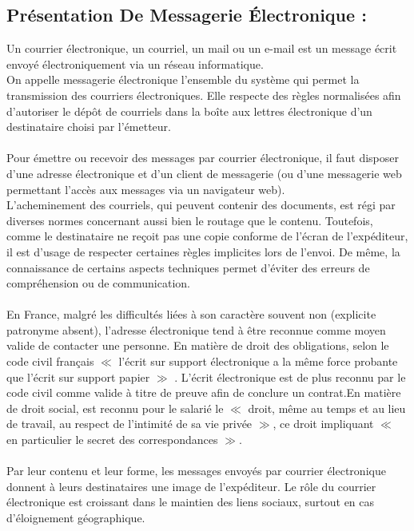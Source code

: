 \documentclass[french]{report}
\begin{document}
\subsection{\huge\textbf{Présentation De Messagerie Électronique :} }
\LARGE Un courrier électronique, un courriel, un mail ou un e-mail est un message écrit envoyé électroniquement via un réseau informatique.\\ 
On appelle messagerie électronique l'ensemble du système qui permet la transmission des courriers électroniques. Elle respecte des règles normalisées afin d'autoriser le dépôt de courriels dans la boîte aux lettres électronique d’un destinataire choisi par l'émetteur.\\ \\
Pour émettre ou recevoir des messages par courrier électronique, il faut disposer d’une adresse électronique et d'un client de messagerie (ou d’une messagerie web permettant l'accès aux messages via un navigateur web).\\ L’acheminement des courriels, qui peuvent contenir des documents, est régi par diverses normes concernant aussi bien le routage que le contenu. Toutefois, comme le destinataire ne reçoit pas une copie conforme de l’écran de l’expéditeur, il est d'usage de respecter certaines règles implicites lors de l’envoi. De même, la connaissance de certains aspects techniques permet d’éviter des erreurs de compréhension ou de communication.\\ \\ En France, malgré les difficultés liées à son caractère souvent non (explicite patronyme absent), l'adresse électronique tend à être reconnue comme moyen valide de contacter une personne. En matière de droit des obligations, selon le code civil français $\ll$ l'écrit sur support électronique a la même force probante que l'écrit sur support papier $\gg$ . L'écrit électronique est de plus reconnu par le code civil comme valide à titre de preuve afin de conclure un contrat.En matière de droit social, est reconnu pour le salarié le $\ll$ droit, même au temps et au lieu de travail, au respect de l'intimité de sa vie privée $\gg$, ce droit impliquant $\ll$ en particulier le secret des correspondances $\gg$.\\ \\ Par leur contenu et leur forme, les messages envoyés par courrier électronique donnent à leurs destinataires une image de l'expéditeur. Le rôle du courrier électronique est croissant dans le maintien des liens sociaux, surtout en cas d'éloignement géographique.
\end{document}
